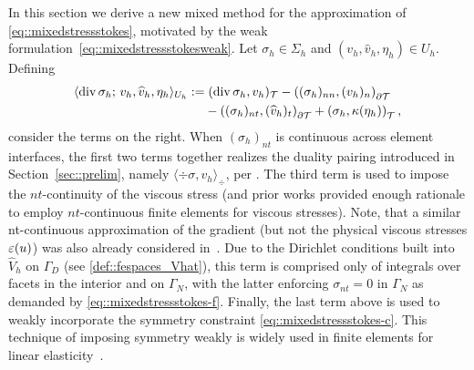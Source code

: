 In this section we derive a new mixed method for the approximation of
\eqref{eq::mixedstressstokes}, motivated by the weak
formulation~\eqref{eq::mixedstressstokesweak}. Let
$\sigma_h \in \Sigma_h$ and $(v_h,\hat v_h, \eta_h) \in U_h$. Defining
\begin{equation}
  \label{eq:div-hybrid-pairing}
\begin{aligned}
  \langle \operatorname{div} \sigma_h ; \, v_h,\widehat v_h, \eta_h \rangle_{U_h} 
  := & \;
    (\operatorname{div}\sigma_h,   v_h)_{\mathcal{T}}
    -
    \left((\sigma_h)_{nn},  (v_h)_n \right)_{\partial \mathcal{T}}
  \\
  &
    -\left( (\sigma_h)_{nt},  (\widehat v_h)_t\right)_{\partial\mathcal{T}}
    +
    \left( \sigma_h, \kappa(\eta_h)\right)_{\mathcal{T}},
\end{aligned}  
\end{equation}
consider the terms on the right.  When $(\sigma_h)_{nt}$ is continuous
across element interfaces, the first two terms together realizes the
duality pairing introduced in Section~\ref{sec::prelim}, namely
$\langle \div \sigma, v_h\rangle_{\div}$, per
\cite[Theorem~3.1]{mcsII}.  The third term is used to impose the
$nt$-continuity of the viscous stress (and prior works \cite{mcsI,
mcsII, lederer2019mass} provided enough rationale to employ
$nt$-continuous finite elements for viscous stresses). Note, that
a similar nt-continuous approximation of the gradient (but not the
physical viscous stresses $\varepsilon(u)$) was also already
considered in~\cite{MR3941890}.  Due to the Dirichlet conditions
built into $\hat{V}_h$ on $\Gamma_D$ (see \eqref{def::fespaces_Vhat}),
this term is comprised only of integrals over facets in the interior
and on $\Gamma_N$, with the latter enforcing $\sigma_{nt}=0$ in
$\Gamma_N$ as demanded by \eqref{eq::mixedstressstokes-f}.  Finally,
the last term above is used to weakly incorporate the symmetry
constraint \eqref{eq::mixedstressstokes-c}.  This technique of
imposing symmetry weakly is widely used in finite elements for linear
elasticity~\cite{MR840802, MR2336264, MR2449101,
MR2629995,MR1464150,GopalGuzma12,Stenberg1988}.  


